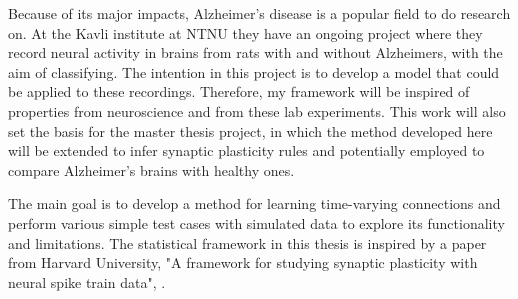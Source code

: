 Because of its major impacts, Alzheimer's disease is a popular field to do research on. At the Kavli institute at NTNU they have an ongoing project where they record neural activity in brains from rats with and without Alzheimers, with the aim of classifying. The intention in this project is to develop a model that could be applied to these recordings. Therefore, my framework will be inspired of properties from neuroscience and from these lab experiments. This work will also set the basis for the master thesis project, in which the method developed here will be extended to infer synaptic plasticity rules and potentially employed to compare Alzheimer's brains with healthy ones. 

The main goal is to develop a method for learning time-varying connections and perform various simple test cases with simulated data to explore its functionality and limitations. The statistical framework in this thesis is inspired by a paper from Harvard University, "A framework for studying synaptic plasticity with neural spike train data", \cite{Linderman}. 